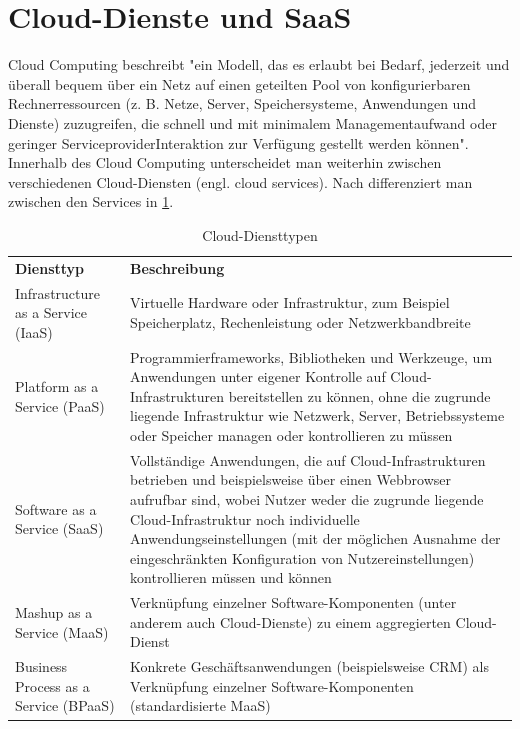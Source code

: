 \section{Cloud-Dienste und SaaS}
Cloud Computing beschreibt "ein Modell, das es erlaubt bei Bedarf, jederzeit und überall bequem über ein Netz auf einen geteilten Pool von konfigurierbaren Rechnerressourcen (z. B. Netze, Server, Speichersysteme, Anwendungen und Dienste) zuzugreifen, die schnell und mit minimalem Managementaufwand oder geringer ServiceproviderInteraktion zur Verfügung gestellt werden können"\citep[S.~18]{appelrath_future_2014-1}. Innerhalb des Cloud Computing unterscheidet man weiterhin zwischen verschiedenen Cloud-Diensten (engl. cloud services). Nach \citep[S.~20]{appelrath_future_2014-1} differenziert man zwischen den Services in \ref{tab:CloudServices}.
\begin{table}[h]
\begin{tabular}{|p{5cm}|p{10cm}|}
\hline
\textbf{Diensttyp} & \textbf{Beschreibung}\\
\hhline{==}
Infrastructure as a Service (IaaS) & Virtuelle Hardware oder Infrastruktur, zum Beispiel Speicherplatz, Rechenleistung oder Netzwerkbandbreite\\
\hline
Platform as a Service (PaaS) & Programmierframeworks, Bibliotheken und Werkzeuge, um Anwendungen unter eigener Kontrolle auf
Cloud-Infrastrukturen bereitstellen zu können, ohne die zugrunde liegende Infrastruktur wie Netzwerk,
Server, Betriebssysteme oder Speicher managen oder kontrollieren zu müssen\\
\hline
Software as a Service (SaaS) & Vollständige Anwendungen, die auf Cloud-Infrastrukturen betrieben und beispielsweise über einen
Webbrowser aufrufbar sind, wobei Nutzer weder die zugrunde liegende Cloud-Infrastruktur noch
individuelle Anwendungseinstellungen (mit der möglichen Ausnahme der eingeschränkten Konfiguration
von Nutzereinstellungen) kontrollieren müssen und können\\
\hline
Mashup as a Service (MaaS) & Verknüpfung einzelner Software-Komponenten (unter anderem auch Cloud-Dienste) zu einem aggregierten
Cloud-Dienst\\
\hline
Business Process as a Service (BPaaS) & Konkrete Geschäftsanwendungen (beispielsweise CRM) als Verknüpfung einzelner Software-Komponenten
(standardisierte MaaS)\\
\hline
\end{tabular}
\caption{Cloud-Diensttypen}
\label{tab:CloudServices}
\end{table}

